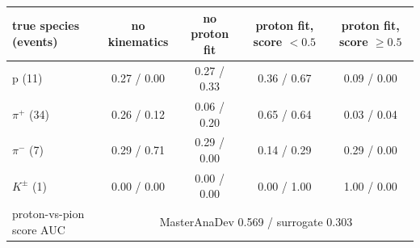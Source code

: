 \begin{tabular}{lcccc}
\toprule
true species (events) & no kinematics & no proton fit & proton fit, score $<0.5$ & proton fit, score $\geq 0.5$ \\
\midrule
p (11) & 0.27 / 0.00 & 0.27 / 0.33 & 0.36 / 0.67 & 0.09 / 0.00 \\
$\pi^+$ (34) & 0.26 / 0.12 & 0.06 / 0.20 & 0.65 / 0.64 & 0.03 / 0.04 \\
$\pi^-$ (7) & 0.29 / 0.71 & 0.29 / 0.00 & 0.14 / 0.29 & 0.29 / 0.00 \\
$K^\pm$ (1) & 0.00 / 0.00 & 0.00 / 0.00 & 0.00 / 1.00 & 1.00 / 0.00 \\
\midrule
proton-vs-pion score AUC & \multicolumn{4}{c}{MasterAnaDev 0.569 / surrogate 0.303} \\
\bottomrule
\end{tabular}
